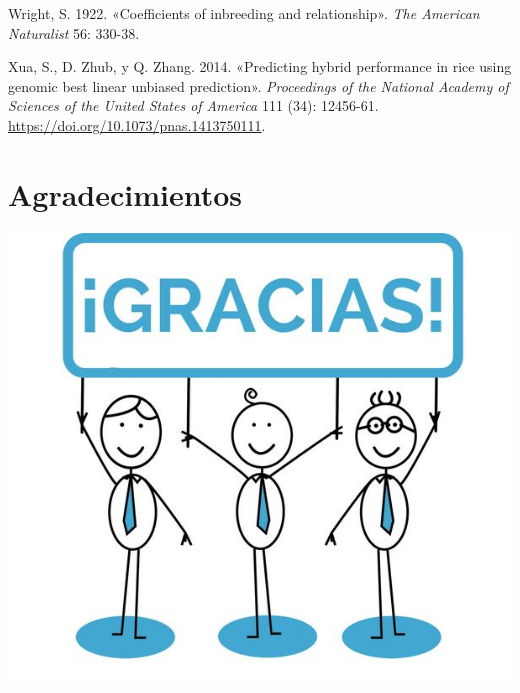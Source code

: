 \documentclass[11pt,spanish,a4paper,oneside,]{book} %
\begin{document}
\leavevmode\hypertarget{ref-cite:12}{}%
Wright, S. 1922. «Coefficients of inbreeding and relationship». \emph{The American Naturalist} 56: 330-38.

\leavevmode\hypertarget{ref-cite:25}{}%
Xua, S., D. Zhub, y Q. Zhang. 2014. «Predicting hybrid performance in rice using genomic best linear unbiased prediction». \emph{Proceedings of the National Academy of Sciences of the United States of America} 111 (34): 12456-61. \url{https://doi.org/10.1073/pnas.1413750111}.

\endgroup

\hypertarget{agradecimientos}{%
\chapter*{Agradecimientos}\label{agradecimientos}}


\includegraphics{figures/uvalogo_regular_p_en.pdf}

\backmatter
\end{document}
